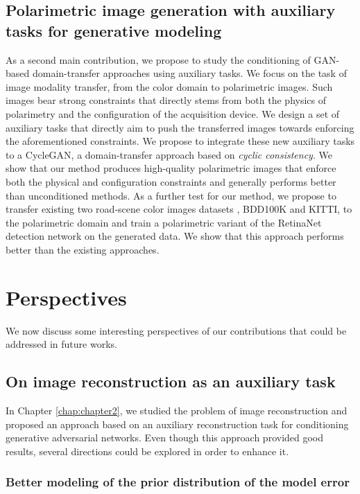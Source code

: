 \subsection*{Polarimetric image generation with auxiliary tasks for generative modeling}

As a second main contribution, we propose to study the conditioning of \ac{GAN}-based domain-transfer approaches using auxiliary tasks. We focus on the task of image modality transfer, from the color domain to polarimetric images. Such images bear strong constraints that directly stems from both the physics of polarimetry and the configuration of the acquisition device. We design a set of auxiliary tasks that directly aim to push the transferred images towards enforcing the aforementioned constraints. We propose to integrate these new auxiliary tasks to a CycleGAN, a domain-transfer approach based on \textit{cyclic consistency}. We show that our method produces high-quality polarimetric images that enforce both the physical and configuration constraints and generally performs better than unconditioned methods. As a further test for our method, we propose to transfer existing two road-scene color images datasets , BDD100K and KITTI, to the polarimetric domain and train a polarimetric variant of the RetinaNet detection network on the generated data. We show that this approach performs better than the existing approaches.

\section*{Perspectives}

We now discuss some interesting perspectives of our contributions that could be addressed in future works.

\subsection*{On image reconstruction as an auxiliary task}

In Chapter \ref{chap:chapter2}, we studied the problem of image reconstruction and proposed an approach based on an auxiliary reconstruction task for conditioning generative adversarial networks. Even though this approach provided good results, several directions could be explored in order to enhance it.

\subsubsection*{Better modeling of the prior distribution of the model error}

